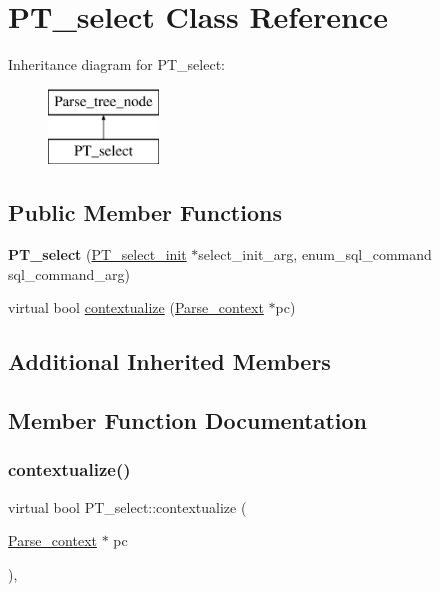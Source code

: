 \hypertarget{classPT__select}{}\section{P\+T\+\_\+select Class Reference}
\label{classPT__select}
Inheritance diagram for P\+T\+\_\+select\+:\begin{figure}[H]
\begin{center}
\leavevmode
\includegraphics[height=2.000000cm]{classPT__select}
\end{center}
\end{figure}
\subsection*{Public Member Functions}
\begin{DoxyCompactItemize}
\item 
\mbox{\label{classPT__select_a63ccf91b568f228e89de1bc9e1054650}} 
{\bfseries P\+T\+\_\+select} (\mbox{\hyperlink{classPT__select__init}{P\+T\+\_\+select\+\_\+init}} $\ast$select\+\_\+init\+\_\+arg, enum\+\_\+sql\+\_\+command sql\+\_\+command\+\_\+arg)
\item 
virtual bool \mbox{\hyperlink{classPT__select_aefab2397c1ee19c99d8229e8e43e115d}{contextualize}} (\mbox{\hyperlink{structParse__context}{Parse\+\_\+context}} $\ast$pc)
\end{DoxyCompactItemize}
\subsection*{Additional Inherited Members}


\subsection{Member Function Documentation}
\mbox{\label{classPT__select_aefab2397c1ee19c99d8229e8e43e115d}} 
\subsubsection{\texorpdfstring{contextualize()}{contextualize()}}
{\footnotesize\ttfamily virtual bool P\+T\+\_\+select\+::contextualize (\begin{DoxyParamCaption}\item[{\mbox{\hyperlink{structParse__context}{Parse\+\_\+context}} $\ast$}]{pc }\end{DoxyParamCaption})\hspace{0.3cm}{\ttfamily [inline]}, {\ttfamily [virtual]}}

